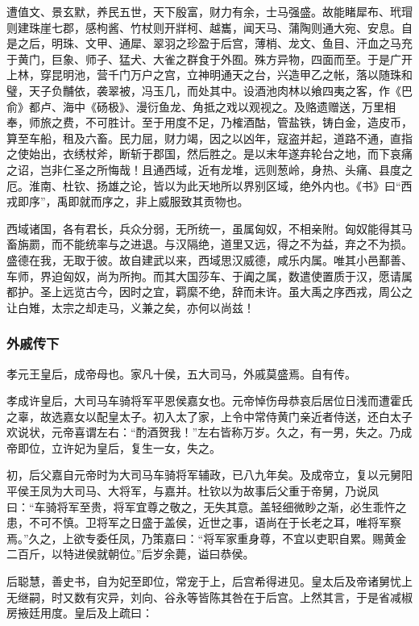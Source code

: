 \documentclass[]{article}
\begin{document}
遭值文、景玄默，养民五世，天下殷富，财力有余，士马强盛。故能睹犀布、玳瑁则建珠崖七郡，感枸酱、竹杖则开牂柯、越巂，闻天马、蒲陶则通大宛、安息。自是之后，明珠、文甲、通犀、翠羽之珍盈于后宫，薄梢、龙文、鱼目、汗血之马充于黄门，巨象、师子、猛犬、大雀之群食于外囿。殊方异物，四面而至。于是广开上林，穿昆明池，营千门万户之宫，立神明通天之台，兴造甲乙之帐，落以随珠和璧，天子负黼依，袭翠被，冯玉几，而处其中。设酒池肉林以飨四夷之客，作《巴俞》都卢、海中《砀极》、漫衍鱼龙、角抵之戏以观视之。及赂遗赠送，万里相奉，师旅之费，不可胜计。至于用度不足，乃榷酒酤，管盐铁，铸白金，造皮币，算至车船，租及六畜。民力屈，财力竭，因之以凶年，寇盗并起，道路不通，直指之使始出，衣绣杖斧，断斩于郡国，然后胜之。是以末年遂弃轮台之地，而下哀痛之诏，岂非仁圣之所悔哉！且通西域，近有龙堆，远则葱岭，身热、头痛、县度之厄。淮南、杜钦、扬雄之论，皆以为此天地所以界别区域，绝外内也。《书》曰``西戎即序''，禹即就而序之，非上威服致其贡物也。

西域诸国，各有君长，兵众分弱，无所统一，虽属匈奴，不相亲附。匈奴能得其马畜旃罽，而不能统率与之进退。与汉隔绝，道里又远，得之不为益，弃之不为损。盛德在我，无取于彼。故自建武以来，西域思汉威德，咸乐内属。唯其小邑鄯善、车师，界迫匈奴，尚为所拘。而其大国莎车、于阗之属，数遣使置质于汉，愿请属都护。圣上远览古今，因时之宜，羁縻不绝，辞而未许。虽大禹之序西戎，周公之让白雉，太宗之却走马，义兼之矣，亦何以尚兹！

\hypertarget{header-n6624}{%
\subsubsection{外戚传下}\label{header-n6624}}

孝元王皇后，成帝母也。家凡十侯，五大司马，外戚莫盛焉。自有传。

孝成许皇后，大司马车骑将军平恩侯嘉女也。元帝悼伤母恭哀后居位日浅而遭霍氏之辜，故选嘉女以配皇太子。初入太了家，上令中常侍黄门亲近者侍送，还白太子欢说状，元帝喜谓左右：``酌酒贺我！''左右皆称万岁。久之，有一男，失之。乃成帝即位，立许妃为皇后，复生一女，失之。

初，后父嘉自元帝时为大司马车骑将军辅政，已八九年矣。及成帝立，复以元舅阳平侯王凤为大司马、大将军，与嘉并。杜钦以为故事后父重于帝舅，乃说凤曰：``车骑将军至贵，将军宜尊之敬之，无失其意。盖轻细微眇之渐，必生乖忤之患，不可不慎。卫将军之日盛于盖侯，近世之事，语尚在于长老之耳，唯将军察焉。''久之，上欲专委任凤，乃策嘉曰：``将军家重身尊，不宜以吏职自累。赐黄金二百斤，以特进侯就朝位。''后岁余薨，谥曰恭侯。

后聪慧，善史书，自为妃至即位，常宠于上，后宫希得进见。皇太后及帝诸舅忧上无继嗣，时又数有灾异，刘向、谷永等皆陈其咎在于后宫。上然其言，于是省减椒房掖廷用度。皇后及上疏曰：
\end{document}
